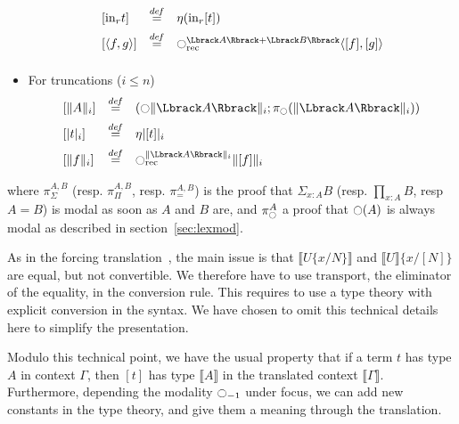 \documentclass[preprint,9pt,numbers]{sigplanconf}
\newtheorem{prop}[thm]{Proposition}
\newcommand \defeq {\overset{de\hspace{-0.2ex}f}{=}}
\newcommand{\modal}{\ensuremath{\ocircle}}
\begin{document}
\begin{itemize}
\[\begin{array}{lcl}
\left[  \mathrm{in}_r t \right] &\defeq& \eta (\mathrm{in}_r [t]) \\[0.5em]
\left[ \langle f ,g\rangle\right] &\defeq& \modal_{\mathrm{rec}}^{\Lbrack A\Rbrack +
                                      \Lbrack B\Rbrack} \langle
                                      [f],[g]\rangle\\[0.5em]
\end{array}
\]
\item For truncations ($i\leqslant n$)
\[
\begin{array}{lcl}
  \left[  \|A\|_i \right] &\defeq& (\modal \| \Lbrack A\Rbrack  \|_i;
                                   \pi_\modal(\| \Lbrack A\Rbrack
                                   \|_i)) \\[0.5em]
  \left[ |t|_i \right] &\defeq& \eta |[t]|_i \\[0.5em]
  \left[ \|f\|_i \right] &\defeq& \modal_{\mathrm{rec}}^{\| \Lbrack
                                  A\Rbrack  \|_i} \| [f] \|_i
\end{array}
\]

\end{itemize}

where $\pi_\Sigma^{A,B}$ (resp. $\pi_\Pi^{A,B}$, resp. $\pi_=^{A,B}$)
is the proof that $\Sigma_{x:A} B$ (resp. $\prod_{x:A} B$, resp $A=B$)
is modal as soon as $A$ and $B$ are, and $\pi_\modal^A$ a proof that
$\modal(A)$ is always modal as described in section~\ref{sec:lexmod}.

As in the forcing translation~\cite{jaber2012extending}, the main
issue is that $\Lbrack U\{x/N\} \Rbrack$ and
$\Lbrack U \Rbrack\{x/[N]\}$ are equal, but not convertible. We
therefore have to use $\mathrm{transport}$, the eliminator of the
equality, in the conversion rule. This requires to use a type theory
with explicit conversion in the syntax. We have chosen to omit this
technical details here to simplify the presentation.



Modulo this technical point, we have the usual property that if a term
$t$ has type $A$ in context $\Gamma$, then $[t]$ has type $\Lbrack
A\Rbrack$ in the translated context $\Lbrack \Gamma\Rbrack$.
%
Furthermore, depending the modality $\modal_{-1}$ under focus, we can
add new constants in the type theory, and give them a meaning through
the translation. 
\end{document}
